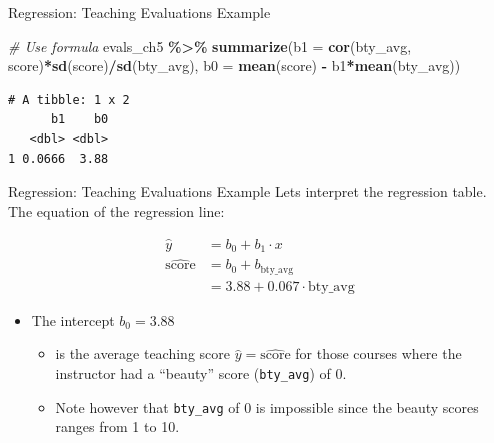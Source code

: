 \documentclass[
  ignorenonframetext,
]{beamer}
\newenvironment{Shaded}{\begin{snugshade}}{\end{snugshade}}
\newcommand{\AttributeTok}[1]{\textcolor[rgb]{0.13,0.29,0.53}{#1}}
\newcommand{\CommentTok}[1]{\textcolor[rgb]{0.56,0.35,0.01}{\textit{#1}}}
\newcommand{\FunctionTok}[1]{\textcolor[rgb]{0.13,0.29,0.53}{\textbf{#1}}}
\newcommand{\NormalTok}[1]{#1}
\newcommand{\SpecialCharTok}[1]{\textcolor[rgb]{0.81,0.36,0.00}{\textbf{#1}}}
\providecommand{\tightlist}{%
  \setlength{\itemsep}{0pt}\setlength{\parskip}{0pt}}
\begin{document}
\begin{frame}[fragile]{Regression: Teaching Evaluations Example}
\protect\hypertarget{regression-teaching-evaluations-example-4}{}
\small

\begin{Shaded}
\begin{Highlighting}[]
\CommentTok{\# Use formula}
\NormalTok{evals\_ch5 }\SpecialCharTok{\%\textgreater{}\%} 
  \FunctionTok{summarize}\NormalTok{(}\AttributeTok{b1 =} \FunctionTok{cor}\NormalTok{(bty\_avg, score)}\SpecialCharTok{*}\FunctionTok{sd}\NormalTok{(score)}\SpecialCharTok{/}\FunctionTok{sd}\NormalTok{(bty\_avg),}
            \AttributeTok{b0 =} \FunctionTok{mean}\NormalTok{(score) }\SpecialCharTok{{-}}\NormalTok{ b1}\SpecialCharTok{*}\FunctionTok{mean}\NormalTok{(bty\_avg))}
\end{Highlighting}
\end{Shaded}

\begin{verbatim}
# A tibble: 1 x 2
      b1    b0
   <dbl> <dbl>
1 0.0666  3.88
\end{verbatim}
\end{frame}

\begin{frame}[fragile]{Regression: Teaching Evaluations Example}
\protect\hypertarget{regression-teaching-evaluations-example-5}{}
Lets interpret the regression table. The equation of the regression
line:

\[
\begin{aligned}
\hat{y} &= b_0 +b_1\cdot x \\
\widehat{\text{score}} &= b_0 + b_{\text{bty\_avg}}\\
&= 3.88 + 0.067\cdot\text{bty\_avg}
\end{aligned}
\]

\begin{itemize}
\item
  The intercept \(b_0 = 3.88\)

  \begin{itemize}
  \tightlist
  \item
    is the average teaching score \(\hat{y}=\widehat{\text{score}}\) for
    those courses where the instructor had a ``beauty'' score
    (\texttt{bty\_avg}) of 0.
  \item
    Note however that \texttt{bty\_avg} of 0 is impossible since the
    beauty scores ranges from 1 to 10.
  \end{itemize}
\end{itemize}
\end{frame}
\end{document}
